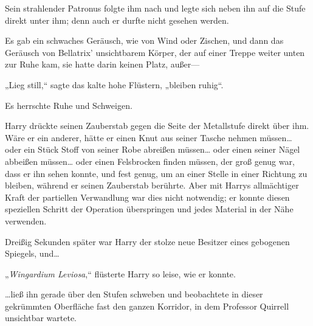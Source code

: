 Sein strahlender Patronus folgte ihm nach und legte sich neben ihn auf die Stufe direkt unter ihm; denn auch er durfte nicht gesehen werden.

Es gab ein schwaches Geräusch, wie von Wind oder Zischen, und dann das Geräusch von Bellatrix' unsichtbarem Körper, der auf einer Treppe weiter unten zur Ruhe kam, sie hatte darin keinen Platz, außer—

„Lieg still,“ sagte das kalte hohe Flüstern, „bleiben ruhig“.

Es herrschte Ruhe und Schweigen.

Harry drückte seinen Zauberstab gegen die Seite der Metallstufe direkt über ihm. Wäre er ein anderer, hätte er einen Knut aus seiner Tasche nehmen müssen… oder ein Stück Stoff von seiner Robe abreißen müssen… oder einen seiner Nägel abbeißen müssen… oder einen Felsbrocken finden müssen, der groß genug war, dass er ihn sehen konnte, und fest genug, um an einer Stelle in einer Richtung zu bleiben, während er seinen Zauberstab berührte. Aber mit Harrys allmächtiger Kraft der partiellen Verwandlung war dies nicht notwendig; er konnte diesen speziellen Schritt der Operation überspringen und jedes Material in der Nähe verwenden.

Dreißig Sekunden später war Harry der stolze neue Besitzer eines gebogenen Spiegels, und…

„\emph{Wingardium Leviosa},“ flüsterte Harry so leise, wie er konnte.

…ließ ihn gerade über den Stufen schweben und beobachtete in dieser gekrümmten Oberfläche fast den ganzen Korridor, in dem Professor Quirrell unsichtbar wartete.

